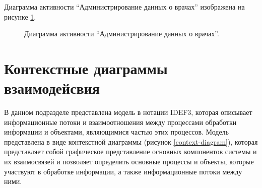         Диаграмма активности “Администрирование данных о врачах” изображена %
        на рисунке \ref{diagram-doctor-admin}.
        \begin{figure}[H]%
            \centering
            \caption{Диаграмма активности “Администрирование данных о врачах”.} \label{diagram-doctor-admin}
        \end{figure} 
    
    \section{Контекстные диаграммы взаимодейсвия}
        В данном подразделе представлена модель в нотации IDEF3, которая %
        описывает информационные потоки и взаимоотношения между процессами %
        обработки информации и объектами, являющимися частью этих процессов. %
        Модель представлена в виде контекстной диаграммы (рисунок \ref{context-diagram}), которая %
        представляет собой графическое представление основных компонентов системы и %
        их взаимосвязей и позволяет определить основные процессы и объекты, которые %
        участвуют в обработке информации, а также информационные потоки между ними. %
        
